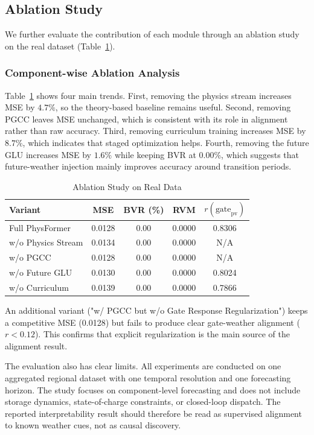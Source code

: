 \FloatBarrier

\subsection{Ablation Study}
\label{subsec:ablation}

We further evaluate the contribution of each module through an ablation study on the real dataset (Table~\ref{tab:ablation}).

\subsubsection{Component-wise Ablation Analysis}
Table~\ref{tab:ablation} shows four main trends. First, removing the physics stream increases MSE by $4.7\%$, so the theory-based baseline remains useful. Second, removing PGCC leaves MSE unchanged, which is consistent with its role in alignment rather than raw accuracy. Third, removing curriculum training increases MSE by $8.7\%$, which indicates that staged optimization helps. Fourth, removing the future GLU increases MSE by $1.6\%$ while keeping BVR at $0.00\%$, which suggests that future-weather injection mainly improves accuracy around transition periods.

\begin{table}[htbp]
\centering
\caption{Ablation Study on Real Data}
\label{tab:ablation}
\footnotesize
\setlength{\tabcolsep}{3pt}
\begin{tabular*}{\columnwidth}{@{\extracolsep{\fill}}lcccc@{}}
\toprule
Variant & MSE & BVR (\%) & RVM & $r(\text{gate}_{\text{pv}})$ \\
\midrule
Full PhysFormer & 0.0128 & 0.00 & 0.0000 & 0.8306 \\
w/o Physics Stream & 0.0134 & 0.00 & 0.0000 & N/A \\
w/o PGCC & 0.0128 & 0.00 & 0.0000 & N/A \\
w/o Future GLU & 0.0130 & 0.00 & 0.0000 & 0.8024 \\
w/o Curriculum & 0.0139 & 0.00 & 0.0000 & 0.7866 \\
\bottomrule
\end{tabular*}
\end{table}

An additional variant ("w/ PGCC but w/o Gate Response Regularization") keeps a competitive MSE (0.0128) but fails to produce clear gate-weather alignment ($r < 0.12$). This confirms that explicit regularization is the main source of the alignment result.

The evaluation also has clear limits. All experiments are conducted on one aggregated regional dataset with one temporal resolution and one forecasting horizon. The study focuses on component-level forecasting and does not include storage dynamics, state-of-charge constraints, or closed-loop dispatch. The reported interpretability result should therefore be read as supervised alignment to known weather cues, not as causal discovery.
